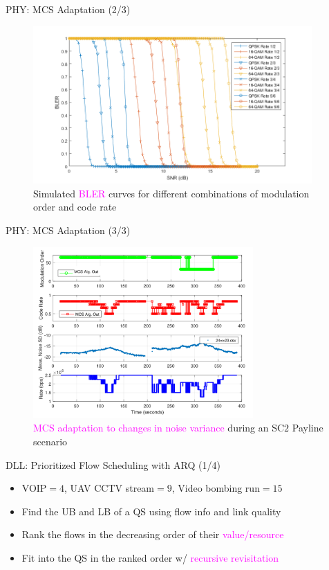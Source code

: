 \documentclass{beamer}
\begin{document}
\begin{frame}{PHY: MCS Adaptation (2/3)}
\begin{figure}
    \centering
    \includegraphics[width = 0.95\textwidth]{BLER.png}
    \caption{Simulated \textcolor{magenta}{BLER} curves for different combinations of modulation order and code rate}
    \label{fig:8}
\end{figure}
\end{frame}
\begin{frame}{PHY: MCS Adaptation (3/3)}
\begin{figure}
    \centering
    \includegraphics[width = 0.75\textwidth]{Payline_MCS_Adaptation.PNG}
    \caption{\textcolor{magenta}{MCS adaptation to changes in noise variance} during an SC$2$ Payline scenario}
    \label{fig:9}
\end{figure}
\end{frame}
\begin{frame}{DLL: Prioritized Flow Scheduling with ARQ (1/4)}
    \begin{itemize}
        \item VOIP${=}4$, UAV CCTV stream${=}9$, Video bombing run${=}15$ 
        \item Find the UB and LB of a QS using flow info and link quality
        \item Rank the flows in the decreasing order of their \textcolor{magenta}{value/resource}
        \item Fit into the QS in the ranked order w/ \textcolor{magenta}{recursive revisitation}
    \end{itemize}
\end{frame}
\end{document}
